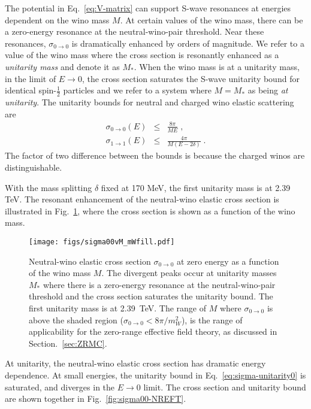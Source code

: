 \documentclass[%
 reprint,
 amsmath,amssymb,
 aps,
]{revtex4-1}
\begin{document}
The potential in Eq.~\eqref{eq:V-matrix} can support S-wave resonances at energies dependent on the wino mass $M$.
At certain values of the wino mass, there can be a zero-energy resonance at the neutral-wino-pair threshold.
Near these resonances, $\sigma_{0 \to 0}$ is dramatically enhanced by orders of magnitude.
We refer to a value of the wino mass where the cross section is resonantly enhanced as a {\it unitarity mass} and denote it as $M_*$.
When the wino mass is at a unitarity mass, in the limit of $E \to 0$, the cross section saturates the S-wave unitarity bound for identical spin-$\tfrac12$ particles and we refer to a system where $M=M_*$ as being {\it at unitarity}.
The unitarity bounds for neutral and charged wino elastic scattering are
\begin{subequations}
\begin{eqnarray}
\sigma_{0\to 0}(E)  &\le& \frac{8 \pi}{ME} \;,
\label{eq:sigma-unitarity0}
\\
\sigma_{1\to 1}(E)  &\le& \frac{4 \pi}{M(E-2\delta)} \;.
\label{eq:sigma-unitarity1}
\end{eqnarray}
\label{eq:sigma-unitarity}
\end{subequations}
The factor of two difference between the bounds is because the charged winos are distinguishable.

With the mass splitting $\delta$ fixed at 170 MeV, the first unitarity mass is at 2.39 TeV.
The resonant enhancement of the neutral-wino elastic cross section is illustrated in Fig.~\ref{fig:sigma00vsM}, where the cross section is shown as a function of the wino mass.

\begin{figure}[t]
\centering
\texttt{[image: figs/sigma00vM\_mWfill.pdf]}
\caption{Neutral-wino elastic cross section $\sigma_{0 \to 0}$ at zero energy as a function of the wino mass $M$.
The divergent peaks occur at unitarity masses $M_*$ where there is a zero-energy resonance at the neutral-wino-pair threshold and the cross section saturates the unitarity bound.
The first unitarity mass is at 2.39~TeV. 
The range of $M$ where $\sigma_{0 \to 0}$ is above the shaded region ($\sigma_{0 \to 0} < 8 \pi/m_W^2$), is the range of applicability for the zero-range effective field theory, as discussed in Section.~\ref{sec:ZRMC}.
}
\label{fig:sigma00vsM}
\end{figure}

At unitarity, the neutral-wino elastic cross section has dramatic energy dependence. At small energies, the unitarity bound in Eq.~\eqref{eq:sigma-unitarity0} is saturated, and diverges in the $E \to 0$ limit. The cross section and unitarity bound are shown together in Fig.~\ref{fig:sigma00-NREFT}.
\end{document}
